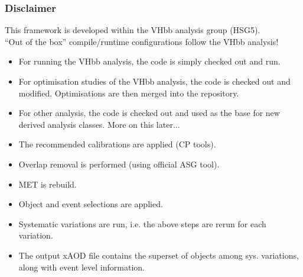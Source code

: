 \documentclass{beamer}
\begin{document}
\begin{frame}
\frametitle{Disclaimer}
This framework is developed within the VHbb analysis group (HSG5).\\
``Out of the box'' compile/runtime configurations follow the VHbb analysis!\\
\vspace{2mm}
\begin{itemize}
 \item For running the VHbb analysis, the code is simply checked out and run. 
 \item For optimisation studies of the VHbb analysis, the code is checked out and 
modified. Optimisations are then merged into the repository.
 \item For {\color{red}other analysis}, the code is checked out and used as the base for new 
derived analysis classes. More on this later... 
\end{itemize}
\begin{itemize}
 \item The recommended calibrations are applied (CP tools).
 \item Overlap removal is performed (using official ASG tool).
 \item MET is rebuild.
 \item Object and event selections are applied.
 \item Systematic variations are run, i.e. the above steps are rerun for each variation.
 \item The output xAOD file contains the superset of objects among sys. variations, 
along with event level information. 
\end{itemize}
\end{frame}
\end{document}

